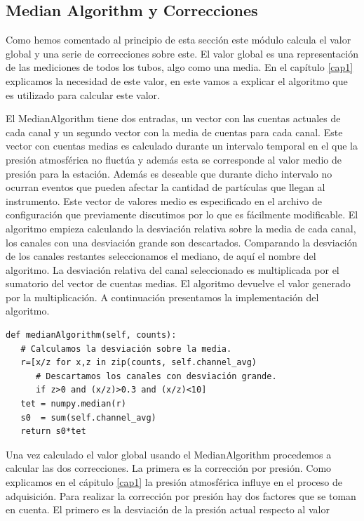 	\subsection{Median Algorithm y Correcciones}
		Como hemos comentado al principio de esta sección este módulo calcula el valor global y una serie de correcciones sobre este. El valor
		global es una representación de las mediciones de todos los tubos, algo como una media. En el capítulo \ref{cap1} explicamos la
		necesidad de este valor, en este vamos a explicar el algoritmo que es utilizado para calcular este valor.
	  	\par 
		El MedianAlgorithm\cite{MedianAlgr} tiene dos entradas, un vector con las cuentas actuales de cada canal y un segundo vector con la
		media de cuentas para cada canal. Este vector con cuentas medias es calculado durante un intervalo temporal en el que la presión
		atmosférica no fluctúa y además esta se corresponde al valor medio de presión para la estación. Además es deseable que durante dicho
		intervalo no ocurran eventos que pueden afectar la cantidad de partículas que llegan al instrumento. Este vector de valores medio es
		especificado  en el archivo de configuración que previamente discutimos por lo que es fácilmente modificable. El algoritmo empieza
		calculando la desviación relativa sobre la media de cada canal, los canales con una desviación grande son descartados. Comparando la
		desviación de los canales restantes seleccionamos el mediano, de aquí el nombre del algoritmo. La desviación relativa del canal
		seleccionado es multiplicada por el sumatorio del vector de cuentas medias. El algoritmo devuelve el valor generado por la
		multiplicación. A continuación presentamos la implementación del algoritmo.
		\begin{lstlisting}[style=myPython]
def medianAlgorithm(self, counts):
   # Calculamos la desviación sobre la media.
   r=[x/z for x,z in zip(counts, self.channel_avg) 
      # Descartamos los canales con desviación grande.
      if z>0 and (x/z)>0.3 and (x/z)<10]
   tet = numpy.median(r)
   s0  = sum(self.channel_avg)
   return s0*tet
		\end{lstlisting}
		\par 
		Una vez calculado el valor global usando el MedianAlgorithm procedemos a calcular las dos correcciones. La primera es la corrección
		por presión. Como explicamos en el cápitulo \ref{cap1} la presión atmosférica influye en el proceso de adquisición. Para realizar la
		corrección por presión hay dos factores que se toman en cuenta. El primero es la desviación de la presión actual respecto al valor
